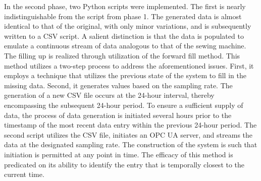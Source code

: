 In the second phase, two Python scripts were implemented. The first is nearly indistinguishable from the script from phase 1. The generated data is almost identical to that of the original, with only minor variations, and is subsequently written to a CSV script. A salient distinction is that the data is populated to emulate a continuous stream of data analogous to that of the sewing machine. The filling up is realized through utilization of the forward fill method. This method utilizes a two-step process to address the aforementioned issues. First, it employs a technique that utilizes the previous state of the system to fill in the missing data. Second, it generates values based on the sampling rate. The generation of a new CSV file occurs at the 24-hour interval, thereby encompassing the subsequent 24-hour period. To ensure a sufficient supply of data, the process of data generation is initiated several hours prior to the timestamp of the most recent data entry within the previous 24-hour period. The second script utilizes the CSV file, initiates an OPC UA server, and streams the data at the designated sampling rate. The construction of the system is such that initiation is permitted at any point in time. The efficacy of this method is predicated on its ability to identify the entry that is temporally closest to the current time.


